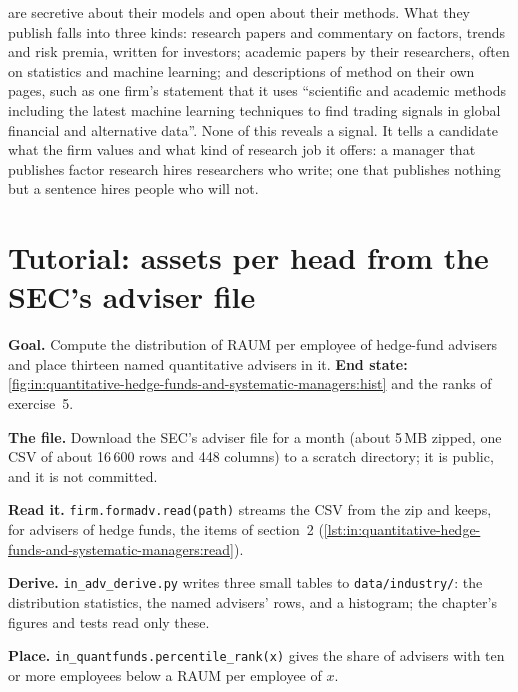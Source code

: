  are secretive about their models and open about their methods. What they publish falls into three
kinds: research papers and commentary on factors, trends and risk premia, written for investors; academic papers by
their researchers, often on statistics and machine learning; and descriptions of method on their own pages, such as one
firm's statement that it uses ``scientific and academic methods including the latest machine learning techniques to find
trading signals in global financial and alternative data''. None of this reveals a signal. It tells a candidate what
the firm values and what kind of research job it offers: a manager that publishes factor research hires researchers who
write; one that publishes nothing but a sentence hires people who will not.

\section{Tutorial: assets per head from the SEC's adviser file}\label{tut:in:quantitative-hedge-funds-and-systematic-managers:tut}

\begin{tutorial}
\textbf{Goal.} Compute the distribution of RAUM per employee of hedge-fund advisers and place thirteen named quantitative
advisers in it. \textbf{End state:} \cref{fig:in:quantitative-hedge-funds-and-systematic-managers:hist} and the ranks of
exercise~5.
\begin{tutsteps}
\item \textbf{The file.} Download the SEC's adviser file for a month (about 5\,MB zipped, one CSV of about 16\,600 rows
and 448 columns) to a scratch directory; it is public, and it is not committed.
\item \textbf{Read it.} \texttt{firm.formadv.read(path)} streams the CSV from the zip and keeps, for advisers of hedge
funds, the items of section~2 (\cref{lst:in:quantitative-hedge-funds-and-systematic-managers:read}).
\label{lst:in:quantitative-hedge-funds-and-systematic-managers:read}
\item \textbf{Derive.} \texttt{in\_adv\_derive.py} writes three small tables to \texttt{data/industry/}: the
distribution statistics, the named advisers' rows, and a histogram; the chapter's figures and tests read only these.
\item \textbf{Place.} \texttt{in\_quantfunds.percentile\_rank(x)} gives the share of advisers with ten or more employees
below a RAUM per employee of $x$.
\end{tutsteps}
\end{tutorial}

